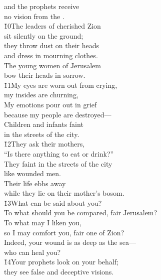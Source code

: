 \begin{poetry}
\poeml and the prophets receive \\
\poemll    no vision from the . \\
\poeml \v{10}The leaders of cherished Zion \\
\poemll    sit silently on the ground; \\
\poeml they throw dust on their heads \\
\poemll    and dress in mourning clothes. \\
\poeml The young women of Jerusalem \\
\poemll    bow their heads in sorrow. \\
\poeml \v{11}My eyes are worn out from crying, \\
\poemll    my insides are churning, \\
\poeml My emotions pour out in grief \\
\poemll    because my people are destroyed--- \\
\poeml Children and infants faint \\
\poemll    in the streets of the city. \\
\poeml \v{12}They ask their mothers, \\
\poemll    ``Is there anything to eat or drink?'' \\
\poeml They faint in the streets of the city \\
\poemll    like wounded men. \\
\poeml Their life ebbs away \\
\poemll    while they lie on their mother's bosom. \\
\poeml \v{13}What can be said about you? \\
\poemll    To what should you be compared, fair Jerusalem? \\
\poeml To what may I liken you, \\
\poemll    so I may comfort you, fair one of Zion? \\
\poeml Indeed, your wound is as deep as the sea--- \\
\poemll    who can heal you? \\
\poeml \v{14}Your prophets look on your behalf; \\
\poemll    they see false and deceptive visions. \\

\end{poetry}
